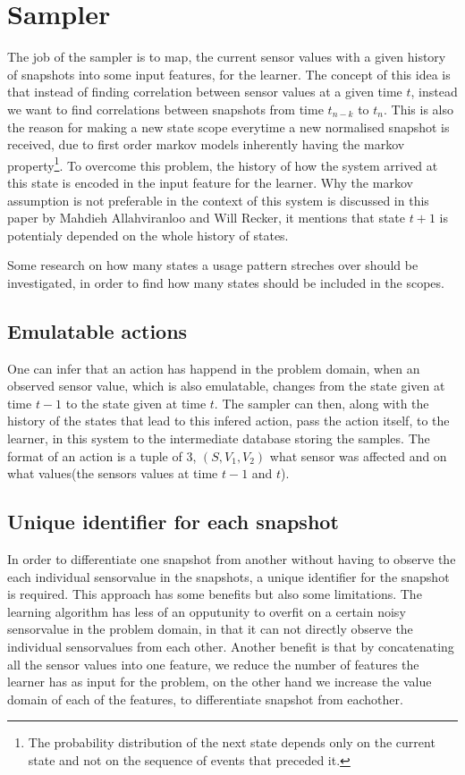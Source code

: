 \section{Sampler}

The job of the sampler is to map, the current sensor values with a given history of snapshots into some input features, for the learner.
The concept of this idea is that instead of finding correlation between sensor values at a given time $t$, instead we want to find correlations between snapshots from time $t_{n-k}$ to $t_n$. This is also the reason for making a new state scope everytime a new normalised snapshot is received, due to first order markov models inherently having the markov property\footnote{The probability distribution of the next state depends only on the current state and not on the sequence of events that preceded it.\cite{wiki_markov_chain}}. To overcome this problem, the history of how the system arrived at this state is encoded in the input feature for the learner. Why the markov assumption is not preferable in the context of this system is discussed in this paper\cite{Allahviranloo201316} by Mahdieh Allahviranloo and Will Recker, it mentions that state $t+1$ is potentialy depended on the whole history of states.

Some research on how many states a usage pattern streches over should be investigated, in order to find how many states should be included in the scopes.

\subsection{Emulatable actions}
One can infer that an action has happend in the problem domain, when an observed sensor value, which is also emulatable, changes from the state given at time $t-1$ to the state given at time $t$. The sampler can then, along with the history of the states that lead to this infered action, pass the action itself, to the learner, in this system to the intermediate database storing the samples. The format of an action is a tuple of 3, $(S,V_1,V_2)$ what sensor was affected and on what values(the sensors values at time $t-1$ and $t$).

\subsection{Unique identifier for each snapshot}

In order to differentiate one snapshot from another without having to observe the each individual sensorvalue in the snapshots, a unique identifier for the snapshot is required.
This approach has some benefits but also some limitations. The learning algorithm has less of an opputunity to overfit on a certain noisy sensorvalue in the problem domain, in that it can not directly observe the individual sensorvalues from each other.
Another benefit is that by concatenating all the sensor values into one feature, we reduce the number of features the learner has as input for the problem, on the other hand we increase the value domain of each of the features, to differentiate snapshot from eachother.

